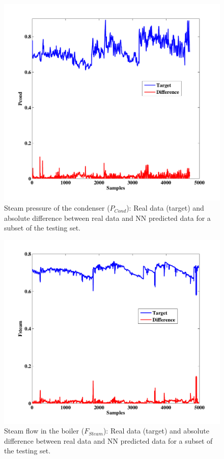\begin{figure}
\centering
\includegraphics[width=1\textwidth]{figures/Pcond.pdf}
\caption{Steam pressure of the condenser ($P_{Cond}$): Real data (target) and absolute difference between real data and NN predicted data for a subset of the testing set.}
\label{Pcond}
\end{figure}

\begin{figure}
\centering
\includegraphics[width=1\textwidth]{figures/Fsteam.pdf}
\caption{Steam flow in the boiler ($F_{Steam}$): Real data (target) and absolute difference between real data and NN predicted data for a subset of the testing set.}
\label{Fboiler}
\end{figure}

